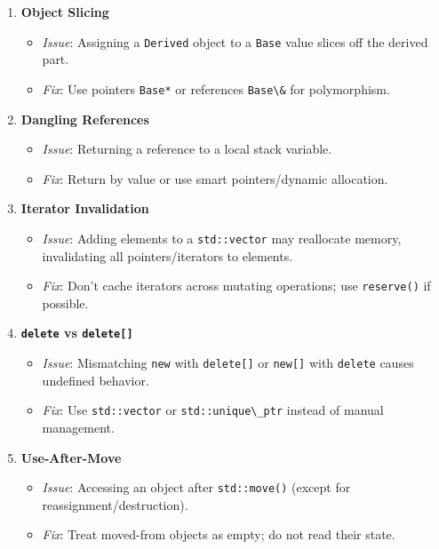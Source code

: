\begin{enumerate}
\def\labelenumi{\arabic{enumi}.}
\setcounter{enumi}{5}
\tightlist
\item
  \textbf{Object Slicing}

  \begin{itemize}
  \tightlist
  \item
    \emph{Issue}: Assigning a \passthrough{\lstinline!Derived!} object
    to a \passthrough{\lstinline!Base!} value slices off the derived
    part.
  \item
    \emph{Fix}: Use pointers \passthrough{\lstinline!Base*!} or
    references \passthrough{\lstinline!Base\&!} for polymorphism.
  \end{itemize}
\item
  \textbf{Dangling References}

  \begin{itemize}
  \tightlist
  \item
    \emph{Issue}: Returning a reference to a local stack variable.
  \item
    \emph{Fix}: Return by value or use smart pointers/dynamic
    allocation.
  \end{itemize}
\item
  \textbf{Iterator Invalidation}

  \begin{itemize}
  \tightlist
  \item
    \emph{Issue}: Adding elements to a
    \passthrough{\lstinline!std::vector!} may reallocate memory,
    invalidating all pointers/iterators to elements.
  \item
    \emph{Fix}: Don't cache iterators across mutating operations; use
    \passthrough{\lstinline!reserve()!} if possible.
  \end{itemize}
\item
  \textbf{\passthrough{\lstinline!delete!} vs
  \passthrough{\lstinline!delete[]!}}

  \begin{itemize}
  \tightlist
  \item
    \emph{Issue}: Mismatching \passthrough{\lstinline!new!} with
    \passthrough{\lstinline!delete[]!} or
    \passthrough{\lstinline!new[]!} with
    \passthrough{\lstinline!delete!} causes undefined behavior.
  \item
    \emph{Fix}: Use \passthrough{\lstinline!std::vector!} or
    \passthrough{\lstinline!std::unique\_ptr!} instead of manual
    management.
  \end{itemize}
\item
  \textbf{Use-After-Move}

  \begin{itemize}
  \tightlist
  \item
    \emph{Issue}: Accessing an object after
    \passthrough{\lstinline!std::move()!} (except for
    reassignment/destruction).
  \item
    \emph{Fix}: Treat moved-from objects as empty; do not read their
    state.
  \end{itemize}
\end{enumerate}

